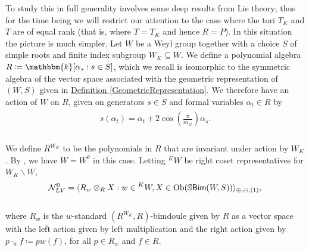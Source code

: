 \noindent To study this in full generality involves some deep results from Lie theory; thus for the time being we will restrict our attention to the case where the tori $T_K$ and $T$ are of equal rank (that is, where $T = T_K$ and hence $R = P$). In this situation the picture is much simpler. Let $W$ be a Weyl group together with a choice $S$ of simple roots and finite index subgroup $W_K \subseteq W$. We define a polynomial algebra $R \coloneqq \mathbbm{k}[\alpha_s : s \in S]$, which we recall is isomorphic to the symmetric algebra of the vector space associated with the geometric representation of $(W, S)$ given in \hyperref[GeometricRepresentation]{Definition \ref*{GeometricRepresentation}}. We therefore have an action of $W$ on $R$, given on generators $s \in S$ and formal variables $\alpha_t \in R$ by\\[-1.1\linespacing]
\begin{align*}
\begin{split}
s(\alpha_t) = \alpha_t + 2\cos\!\left(\frac{\pi}{m_{st}}\right)\!\alpha_s.
\end{split}
\end{align*}
\noindent\\[-0.7\linespacing] We define $R^{W_K}$ to be the polynomials in $R$ that are invariant under action by $W_K$. By \cite[Remark 6.2.4]{LR22}, we have $W = W^\theta$ in this case. Letting ${}^KW$ be right coset representatives for $W_K\backslash W$,\\[-1.2\linespacing]
\begin{align*}
\begin{split}
\mathcal{N}_{LV}^0 = \langle R_w \otimes_R X : w \in {}^KW, X \in \textup{Ob}(\mathbb{S}\textup{\textsf{Bim}}(W, S))\rangle_{\oplus,\ominus,(1)},
\end{split}
\end{align*}
\noindent\\[-1.2\linespacing] where $R_w$ is the $w$-standard $(R^{W_K}, R)$-bimdoule given by $R$ as a vector space with the left action given by left multiplication and the right action given by $p \cdot_w f \coloneqq p w(f)$, for all $p \in R_w$ and $f \in R$.\newpage

